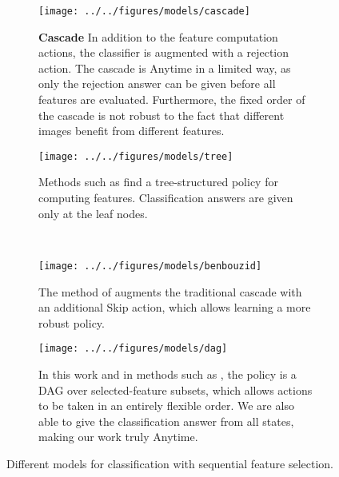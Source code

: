 \begin{figure}[h!]
\centering
\begin{subfigure}[t]{0.48\linewidth}
    \texttt{[image: ../../figures/models/cascade]}
    \caption{
\textbf{Cascade}
In addition to the feature computation actions, the classifier is augmented with a rejection action.
The cascade is Anytime in a limited way, as only the rejection answer can be given before all features are evaluated.
Furthermore, the fixed order of the cascade is not robust to the fact that different images benefit from different features.
}
\end{subfigure}\hfill%
\begin{subfigure}[t]{0.48\linewidth}
    \texttt{[image: ../../figures/models/tree]}
    \caption{
Methods such as \cite{Xu-ICML-2012} find a tree-structured policy for computing features.
Classification answers are given only at the leaf nodes.
    }
\end{subfigure}\\
\begin{subfigure}[t]{0.48\linewidth}
    \texttt{[image: ../../figures/models/benbouzid]}
    \caption{
The method of \cite{Benbouzid-ICML-2012} augments the traditional cascade with an additional Skip action, which allows learning a more robust policy.
}
\end{subfigure}\hfill%
\begin{subfigure}[t]{0.48\linewidth}
    \texttt{[image: ../../figures/models/dag]}
    \caption{
In this work and in methods such as \cite{Gao-NIPS-2011}, the policy is a DAG over selected-feature subsets, which allows actions to be taken in an entirely flexible order.
We are also able to give the classification answer from all states, making our work truly Anytime.
    }
\end{subfigure}
\caption{
Different models for classification with sequential feature selection.
}\label{fig:models}
\end{figure}
